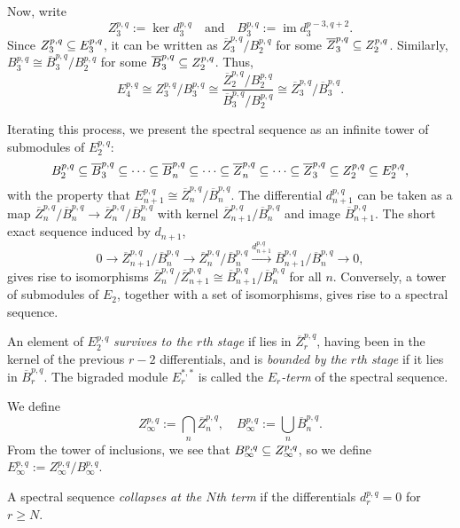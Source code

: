 \documentclass{MetricNotes2023}
\def\subq{\ensuremath\subseteq}
\DeclareMathOperator{\im}{im}
\begin{document}
Now, write 
\[Z_3^{p, q}:=\ker d_3^{p,q} \quad \text{and} \quad B_3^{p,q}:=\im d_3^{p-3,q+2}.\]
Since \(Z_3^{p,q}\subq E^{p,q}_3\), it can be written as \(\overline{Z}_3^{p,q}/B_2^{p,q}\) for some \(\overline{Z}_3^{p,q}\subq Z_2^{p,q}\). Similarly, \(B_3^{p,q}\cong \overline B_3^{p,q}/B_2^{p,q}\) for some \(\overline B_3^{p,q}\subq Z_2^{p,q}\). Thus,
\[E_4^{p,q}\cong Z_3^{p,q}/B_3^{p,q}\cong \frac{\overline Z_2^{p,q}/B_2^{p,q}}{\overline B_3^{p,q}/B_2^{p,q}}\cong \overline Z_3^{p,q}/\overline B_3^{p,q}.\]

Iterating this process, we present the spectral sequence as an infinite tower of submodules of \(E_2^{p,q}\):
\[B_2^{p,q}\subq \overline B_3^{p,q}\subq \cdots \subq \overline B_n^{p,q}\subq \cdots \subq \overline Z_n^{p,q}\subq \cdots \subq \overline Z_3^{p,q}\subq Z_2^{p,q}\subq E_2^{p,q},\]
with the property that \(E^{p,q}_{n+1}\cong \overline Z_n^{p,q}/\overline B_n^{p,q}\). The differential \(d_{n+1}^{p,q}\) can be taken as a map \(\overline Z^{p,q}_n/\overline B_n^{p,q}\to\overline Z_n^{p,q}/\overline B_n^{p,q}\) with kernel \(\overline Z_{n+1}^{p,q}/\overline B_n^{p,q}\) and image \(\overline B_{n+1}^{p,q}\). The short exact sequence induced by \(d_{n+1}\),
\[0 \to \overline Z^{p,q}_{n+1}/\overline B_n^{p,q}\to \overline Z_n^{p,q}/\overline B_n^{p,q} \xrightarrow{d_{n+1}^{p,q}} \overline B_{n+1}^{p,q}/\overline{B}_n^{p,q}\to 0,\]
gives rise to isomorphisms \(\overline{Z}_n^{p,q}/\overline{Z}_{n+1}^{p,q}\cong \overline{B}_{n+1}^{p,q}/\overline{B}_n ^{p,q}\) for all \(n\). Conversely, a tower of submodules of \(E_2\), together with a set of isomorphisms, gives rise to a spectral sequence. 

\begin{definition}
An element of \(E_2^{p,q}\) \textit{survives to the \(r\)th stage} if lies in \(\overline{Z}_r^{p,q}\), having been in the kernel of the previous \(r-2\) differentials, and is \textit{bounded by the \(r\)th stage} if it lies in \(\overline{B}_r^{p,q}\). The bigraded module \(E_r^{*,*}\) is called the \textit{\(E_r\)-term} of the spectral sequence. 
\end{definition}

We define 
\[Z_\infty^{p,q}:= \bigcap_n \overline{Z}^{p,q}_n, \quad B_\infty^{p,q}:=\bigcup_n \overline{B}^{p,q}_n.\]
From the tower of inclusions, we see that \(B_\infty^{p,q}\subq Z^{p,q}_\infty\), so we define \(E_\infty^{p,q}:=Z_\infty^{p,q}/B_\infty^{p,q}\). 

\begin{definition}
A spectral sequence \textit{collapses at the \(N\)th term} if the differentials \(d_r^{p,q}=0\) for \(r\geq N\). 
\end{definition}
\end{document}
